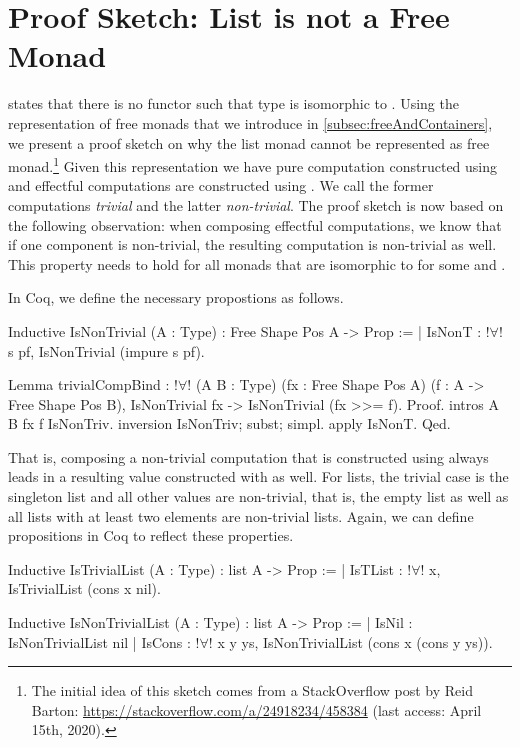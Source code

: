\section{Proof Sketch: List is not a Free Monad}
\label{sec:appendix:freeList}

\citet{swierstra2008data} states that there is no functor  such that type  is isomorphic to \hinl{[a]}.
Using the representation of free monads that we introduce in \autoref{subsec:freeAndContainers}, we present a proof sketch on why the list monad cannot be represented as free monad.\footnote{The initial idea of this sketch comes from a StackOverflow post by Reid Barton: \url{https://stackoverflow.com/a/24918234/458384} (last access: April 15th, 2020).}
Given this representation we have pure computation constructed using  and effectful computations are constructed using .
We call the former computations \emph{trivial} and the latter \emph{non-trivial}.
The proof sketch is now based on the following observation: when composing effectful computations, we know that if one component is non-trivial, the resulting computation is non-trivial as well.
This property needs to hold for all monads that are isomorphic to  for some  and .

In Coq, we define the necessary propostions as follows.

\begin{coqcode}
Inductive IsNonTrivial (A : Type) : Free Shape Pos A -> Prop :=
| IsNonT : !$\forall$! s pf, IsNonTrivial (impure s pf).

Lemma trivialCompBind : !$\forall$! (A B : Type)
  (fx : Free Shape Pos A) (f : A -> Free Shape Pos B),
  IsNonTrivial fx -> IsNonTrivial (fx >>= f).
Proof.
  intros A B fx f IsNonTriv.
  inversion IsNonTriv; subst; simpl.
  apply IsNonT.
Qed.
\end{coqcode}

That is, composing a non-trivial computation that is constructed using  always leads in a resulting value constructed with  as well.
For lists, the trivial case is the singleton list and all other values are non-trivial, that is, the empty list as well as all lists with at least two elements are non-trivial lists.
Again, we can define propositions in Coq to reflect these properties.

\begin{coqcode}
Inductive IsTrivialList (A : Type) : list A -> Prop :=
| IsTList : !$\forall$! x, IsTrivialList (cons x nil).

Inductive IsNonTrivialList (A : Type) : list A -> Prop :=
| IsNil  : IsNonTrivialList nil
| IsCons : !$\forall$! x y ys, IsNonTrivialList (cons x (cons y ys)).
\end{coqcode}

